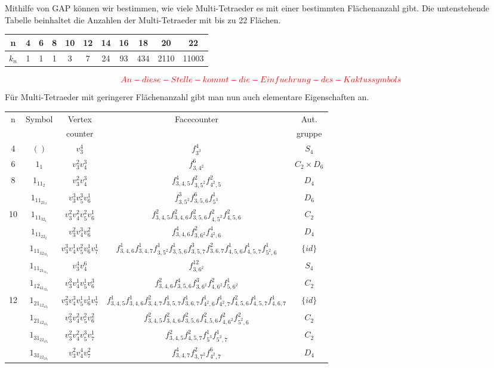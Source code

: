 \documentclass[12pt,titlepage,twoside,cleardoublepage]{article}
\theoremstyle{nummermitklammern}
\numberwithin{equation}{section}
\begin{document}
Mithilfe von GAP können wir bestimmen, wie viele Multi-Tetraeder es mit einer bestimmten Flächenanzahl gibt.
Die untenstehende Tabelle beinhaltet die Anzahlen der Multi-Tetraeder mit bis zu 22 Flächen.
\begin{center}
\begin{tabular}[h]{|c|c|c|c|c|c|c|c|c|c|c|}
\hline
n& 4 &  6& 8 & 10 & 12 & 14&16&18&20&22\\
\hline
 $k_n$ &1 & 1& 1 & 3 & 7 & 24 & 93 & 434 & 2110 & 11003   \\
 \hline
\end{tabular}
\end{center}
\[
\textcolor{red}{An-diese-Stelle-kommt-die-Einfuehrung-des- Kaktussymbols}
\]
Für Multi-Tetraeder mit geringerer Flächenanzahl gibt man nun auch elementare Eigenschaften an.

\begin{center}
\begin{tabular}[h]{|c|c|c|c|c|}
\hline
n & Symbol & Vertex& Facecounter & Aut. \\
 &&counter&& gruppe\\
\hline
4 & $()$ &$v_3^4$ & $f_{3^3}^4$ &$S_4$\\
\hline
6 & $1_1$ & $v_3^2v_4^3$&$f^6_{3,4^2}$ &$C_2\times D_6$\\
\hline
8 & $1_11_2$&$ v_3^2v_4^3$& $f^4_{3,4,5}f^2_{3,5^2}f^2_{4^2,5}$ & $D_4$\\
\hline  
  & $1_11_21_3$ & $v_3^3v_5^3v_6^1$& $f^3_{3,5^2}f^6_{3,5,6}f^1_{5^3}$ &$D_6$\\
10& $1_11_32_1$ &$v_3^2v_4^2v_5^2v_6^1$ & $f^2_{3,4,5}f^2_{3,4,6}f^2_{3,5,6}f^2_{4,5^2}f^2_{4,5,6}$ & $C_2$\\
  & $1_11_22_2$ &$v_3^2v_4^3v_6^2$& $f^4_{3,4,6}f^2_{3,6^2}f^4_{4^2,6}$ &$D_4$\\
\hline
  & $1_11_32_32_2$&$v_3^3v_4^1v_5^2v_6^1v_7^1$& $f^1_{3,4,6}f^1_{3,4,7}f^1_{3,5^2}f^1_{3,5,6}f^3_{3,5,7}f^2_{3,6,7}f^1_{4,5,6}f^1_{4,5,7}f^1_{5^2,6}$ &$\{id\}$\\
  & $1_11_21_31_4$& $v_3^4v_4^6$& $f^{12}_{3,6^2}$ &$S_4$\\
  & $1_12_41_32_2$&$v_3^3v_4^1v_5^1v_6^3$& $f^2_{3,4,6}f^4_{3,5,6}f^3_{3,6^2}f^2_{4,6^2}f^1_{5,6^2}$ & $C_2$\\
12& $1_21_12_43_2$&$v_3^2v_4^3v_5^1v_6^1v_7^1$& $f^1_{3,4,5}f^1_{3,4,6}f^2_{3,4,7}f^1_{3,5,7}f^1_{3,6,7}f^1_{4^2,6}f^1_{4^2,7}f^2_{4,5,6}f^1_{4,5,7}f^1_{4,6,7}$ &$\{id\}$\\
  & $1_21_12_43_3$& $v_3^2v_4^2v_5^2v_6^2$& $f^2_{3,4,5}f^2_{3,4,6}f^2_{3,5,6}f^2_{4,5,6}f^2_{4,6^2}f^2_{5^2,6}$&$C_2$\\
  & $1_31_22_43_4$& $v_3^2v_4^2v_5^3v_7^1$& $f^2_{3,4,5}f^2_{4,5,7}f^1_{5^3}f^1_{5^2,7}$&$C_2$\\
  & $1_31_22_23_3$& $v_3^2v_4^4v_7^2$&$f^4_{3,4,7}f^2_{3,7^2}f^6_{4^2,7}$ &$D_4$\\
 \hline
\end{tabular}
\end{center}
\end{document}
